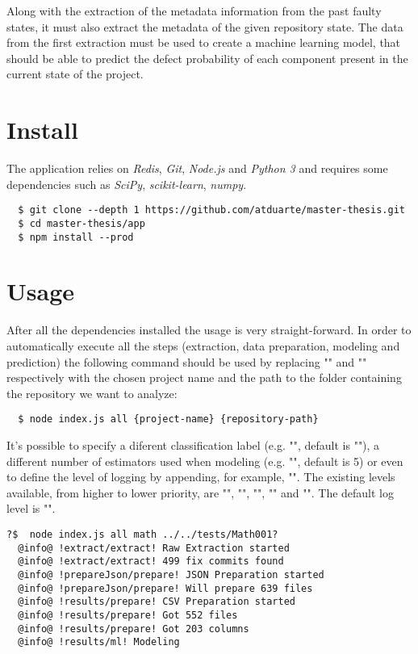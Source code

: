 Along with the extraction of the metadata information from the past faulty states, it must also extract the metadata of the given repository state. The data from the first extraction must be used to create a machine learning model, that should be able to predict the defect probability of each component present in the current state of the project.


\section{Install}

The application relies on \emph{Redis}, \emph{Git}, \emph{Node.js} and \emph{Python 3} and requires some dependencies such as \emph{SciPy}, \emph{scikit-learn}, \emph{numpy}.

\begin{lstlisting}
  $ git clone --depth 1 https://github.com/atduarte/master-thesis.git
  $ cd master-thesis/app
  $ npm install --prod
\end{lstlisting}

\section{Usage}

After all the dependencies installed the usage is very straight-forward.
In order to automatically execute all the steps (extraction, data preparation, modeling and prediction) the following command should be used
by replacing "" and "" respectively with
the chosen project name and the path to the folder containing the repository we want to analyze:

\begin{lstlisting}
  $ node index.js all {project-name} {repository-path}
\end{lstlisting}

It's possible to specify a diferent classification label (e.g. "", default is ""), 
a different number of estimators used when modeling (e.g. "", default is 5) or even
to define the level of logging by appending, for example, "". The existing levels available, from higher to lower priority, are
"", "", "", "" and "". The default log level is "".

\begin{lstlisting}[style=npmlog]
  ?$  node index.js all math ../../tests/Math001?
  @info@ !extract/extract! Raw Extraction started
  @info@ !extract/extract! 499 fix commits found
  @info@ !prepareJson/prepare! JSON Preparation started
  @info@ !prepareJson/prepare! Will prepare 639 files
  @info@ !results/prepare! CSV Preparation started
  @info@ !results/prepare! Got 552 files
  @info@ !results/prepare! Got 203 columns
  @info@ !results/ml! Modeling
\end{lstlisting}

